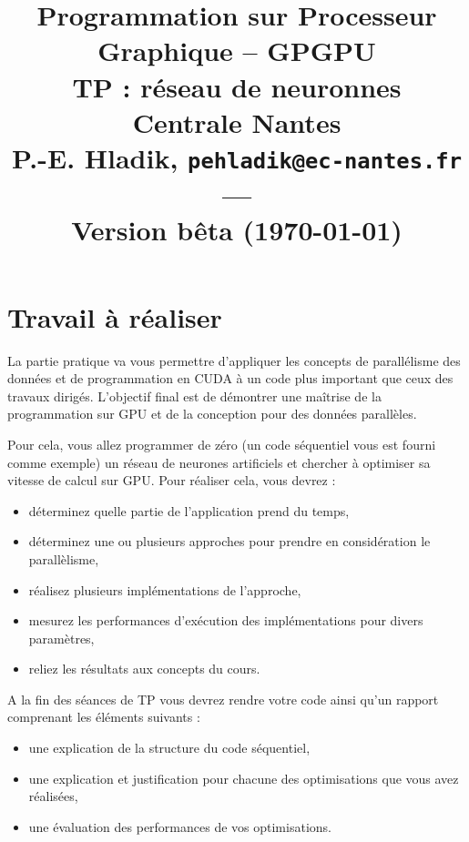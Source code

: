 \documentclass[11pt]{paper}
\title{{\Large Programmation sur Processeur Graphique -- GPGPU }\\
\vspace{-0.4em}
{\large TP : réseau de neuronnes}\\
{\small Centrale Nantes}\\
\small P.-E. Hladik, \small{\texttt{pehladik@ec-nantes.fr}}\\
---\\
{\scriptsize  Version bêta (\today)}\\
}
\begin{document}
\maketitle

  \section{Travail à réaliser}

La partie pratique va vous permettre d'appliquer les concepts de parallélisme des données et de programmation en CUDA à un code plus important que ceux des travaux dirigés. 
L'objectif final est de démontrer une maîtrise de la programmation sur GPU et de la conception pour des données parallèles.

Pour cela, vous allez programmer de zéro (un code séquentiel vous est fourni comme exemple) un réseau de neurones artificiels et chercher à optimiser sa vitesse de calcul sur GPU.
Pour réaliser cela, vous devrez :
\begin{itemize}
	\item déterminez quelle partie de l'application prend du temps,
	\item déterminez une ou plusieurs approches pour prendre en considération le parallèlisme,
	\item réalisez plusieurs implémentations de l'approche,
	\item mesurez les performances d'exécution des implémentations pour divers paramètres,
	\item reliez les résultats aux concepts du cours.\medskip
\end{itemize}

A la fin des séances de TP vous devrez rendre votre code ainsi qu'un rapport comprenant les éléments suivants :
\begin{itemize}
	\item une explication de la structure du code séquentiel,
	\item une explication et justification pour chacune des optimisations que vous avez réalisées,
	\item une évaluation des performances de vos optimisations.\medskip
\end{itemize}
\end{document}
